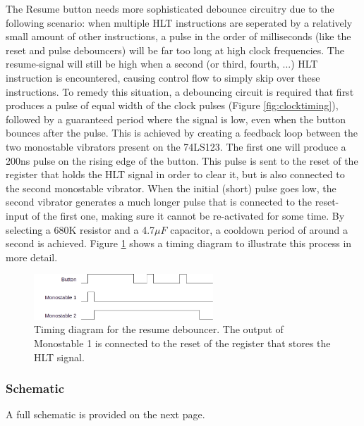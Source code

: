 The Resume button needs more sophisticated debounce circuitry due to the following scenario: when multiple HLT instructions are seperated by a relatively small amount of other instructions, a pulse in the order of milliseconds (like the reset and pulse debouncers) will be far too long at high clock frequencies. The resume-signal will still be high when a second (or third, fourth, ...) HLT instruction is encountered, causing control flow to simply skip over these instructions. To remedy this situation, a debouncing circuit is required that first produces a pulse of equal width of the clock pulses (Figure \ref{fig:clocktiming}), followed by a guaranteed period where the signal is low, even when the button bounces after the pulse. This is achieved by creating a feedback loop between the two monostable vibrators present on the 74LS123. The first one will produce a 200ns pulse on the rising edge of the button. This pulse is sent to the reset of the register that holds the HLT signal in order to clear it, but is also connected to the second monostable vibrator. When the initial (short) pulse goes low, the second vibrator generates a much longer pulse that is connected to the reset-input of the first one, making sure it cannot be re-activated for some time. By selecting a 680K resistor and a 4.7$\mu F$ capacitor, a cooldown period of around a second is achieved. Figure \ref{fig:resumedebounce} shows a timing diagram to illustrate this process in more detail. 

\begin{figure}[H]
  \centering
  \includegraphics[width=0.6\textwidth]{img/resumedebounce}
  \caption{Timing diagram for the resume debouncer. The output of Monostable 1 is connected to the reset of the register that stores the HLT signal.}
  \label{fig:resumedebounce}
\end{figure}


\subsubsection{Schematic}
A full schematic is provided on the next page.



